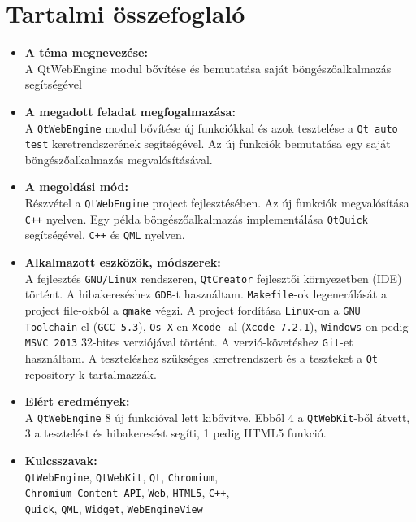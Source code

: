 \documentclass[12pt]{report}
\def\title{A QtWebEngine modul bővítése és bemutatása saját böngészőalkalmazás segítségével}
\begin{document}
\chapter*{Tartalmi összefoglaló}
\begin{itemize}
    \item \textbf{A téma megnevezése:} \\
        \title
    \item \textbf{A megadott feladat megfogalmazása:} \\
        A \texttt{QtWebEngine} modul bővítése új funkciókkal és azok tesztelése a
        \texttt{Qt auto test} keretrendszerének segítségével. Az új funkciók bemutatása
        egy saját böngészőalkalmazás megvalósításával.
    \item \textbf{A megoldási mód:} \\
        Részvétel a \texttt{QtWebEngine} project fejlesztésében. Az új funkciók
        megvalósítása \texttt{C++} nyelven. Egy példa böngészőalkalmazás implementálása
        \texttt{QtQuick} segítségével, \texttt{C++} és \texttt{QML} nyelven.
    \item \textbf{Alkalmazott eszközök, módszerek:} \\
        A fejlesztés \texttt{GNU/Linux} rendszeren, \texttt{QtCreator} fejlesztői
        környezetben (IDE) történt. A hibakereséshez \texttt{GDB}-t használtam.
        \texttt{Makefile}-ok legenerálását a project file-okból a \texttt{qmake} végzi.
        A project fordítása \texttt{Linux}-on a \texttt{GNU Toolchain}-el (\texttt{GCC 5.3}),
        \texttt{Os X}-en \texttt{Xcode} -al (\texttt{Xcode 7.2.1}), \texttt{Windows}-on pedig
        \texttt{MSVC 2013} 32-bites verziójával történt. A verzió-követéshez \texttt{Git}-et
        használtam. A teszteléshez szükséges keretrendszert és a teszteket a \texttt{Qt}
        repository-k tartalmazzák.
    \item \textbf{Elért eredmények:} \\
        A \texttt{QtWebEngine} 8 új funkcióval lett kibővítve. Ebből 4 a \texttt{QtWebKit}-ből
        átvett, 3 a tesztelést és hibakeresést segíti, 1 pedig HTML5 funkció.
    \item \textbf{Kulcsszavak:} \\
        \texttt{QtWebEngine}, \texttt{QtWebKit}, \texttt{Qt}, \texttt{Chromium}, \\
        \texttt{Chromium Content API}, \texttt{Web}, \texttt{HTML5}, \texttt{C++}, \\
        \texttt{Quick}, \texttt{QML}, \texttt{Widget}, \texttt{WebEngineView}
\end{itemize}
\end{document}
